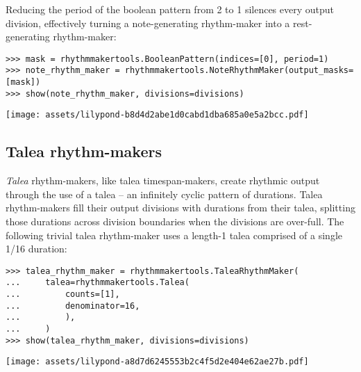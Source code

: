 \noindent Reducing the period of the boolean pattern from 2 to 1 silences every
output division, effectively turning a note-generating rhythm-maker into a
rest-generating rhythm-maker:

\begin{comment}
<abjad>
mask = rhythmmakertools.BooleanPattern(indices=[0], period=1)
note_rhythm_maker = rhythmmakertools.NoteRhythmMaker(output_masks=[mask])
show(note_rhythm_maker, divisions=divisions)
</abjad>
\end{comment}

\begin{abjadbookoutput}
\begin{singlespacing}
\vspace{-0.5\baselineskip}
\begin{verbatim}
>>> mask = rhythmmakertools.BooleanPattern(indices=[0], period=1)
>>> note_rhythm_maker = rhythmmakertools.NoteRhythmMaker(output_masks=[mask])
>>> show(note_rhythm_maker, divisions=divisions)
\end{verbatim}
\noindent\texttt{[image: assets/lilypond-b8d4d2abe1d0cabd1dba685a0e5a2bcc.pdf]}
\end{singlespacing}
\end{abjadbookoutput}

\subsection{Talea rhythm-makers}

\emph{Talea} rhythm-makers, like talea timespan-makers, create rhythmic output through
the use of a talea -- an infinitely cyclic pattern of durations. Talea
rhythm-makers fill their output divisions with durations from their talea,
splitting those durations across division boundaries when the divisions are
over-full. The following trivial talea rhythm-maker uses a length-1 talea
comprised of a single 1/16 duration:

\begin{comment}
<abjad>
talea_rhythm_maker = rhythmmakertools.TaleaRhythmMaker(
    talea=rhythmmakertools.Talea(
        counts=[1],
        denominator=16,
        ),
    )
show(talea_rhythm_maker, divisions=divisions)
</abjad>
\end{comment}

\begin{abjadbookoutput}
\begin{singlespacing}
\vspace{-0.5\baselineskip}
\begin{verbatim}
>>> talea_rhythm_maker = rhythmmakertools.TaleaRhythmMaker(
...     talea=rhythmmakertools.Talea(
...         counts=[1],
...         denominator=16,
...         ),
...     )
>>> show(talea_rhythm_maker, divisions=divisions)
\end{verbatim}
\noindent\texttt{[image: assets/lilypond-a8d7d6245553b2c4f5d2e404e62ae27b.pdf]}
\end{singlespacing}
\end{abjadbookoutput}

